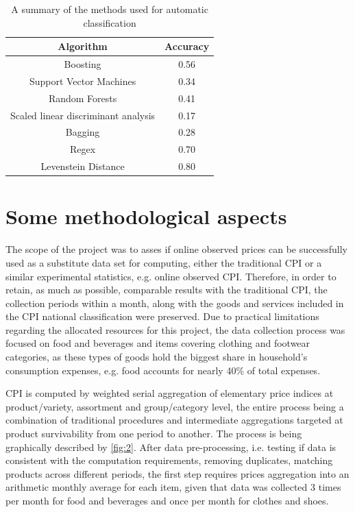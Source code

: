 \documentclass[]{article}
\begin{document}
\begin{table}[h!]
\centering
\begin{tabular}{| c| c| }
	\hline
	Algorithm & Accuracy \\
	\hline  
	Boosting & 0.56 \\  
	Support Vector Machines & 0.34 \\
	Random Forests &  0.41 \\
	Scaled linear discriminant analysis & 0.17 \\
	Bagging & 0.28 \\
	Regex & 0.70 \\
	Levenstein Distance & 0.80 \\
	\hline
\end{tabular}
\caption{A summary of the methods used for automatic classification}
\label{table:1}
\end{table}

\section{Some methodological aspects}\label{methodology}

The scope of the project was to asses if online observed prices can be successfully used as a substitute data set for computing, either the traditional CPI or a similar experimental statistics, e.g. online observed CPI. Therefore, in order to retain, as much as possible, comparable results with the traditional CPI, the collection periods within a month, 
along with the goods and services included in the CPI national classification were preserved. Due to practical limitations regarding the allocated resources for this project, the data collection process was focused on food and beverages and items covering clothing and footwear categories, as these types of goods
hold the biggest share in household's consumption expenses, e.g. food accounts for nearly 40\% of total expenses\cite{hhs}. 

CPI is computed by weighted serial aggregation of elementary price indices at product/variety, assortment and group/category level, the entire process being a combination of traditional procedures\cite{cpi} and intermediate aggregations targeted at product survivability from one period to another. The process is being graphically described by \ref{fig:2}. After data pre-processing, i.e. testing if data is consistent with the computation requirements, removing duplicates, matching products across different periods, the first step requires prices aggregation into an arithmetic 
monthly average for each item, given that data was collected 3 times per month for food and beverages and once per month for clothes and shoes. 
\end{document}
